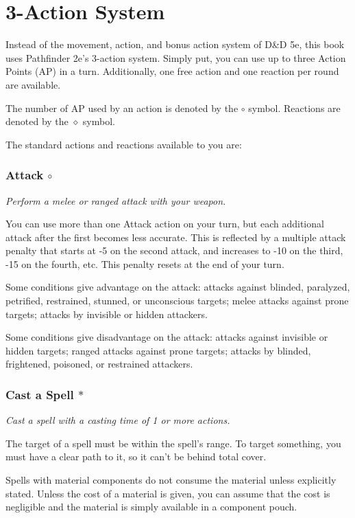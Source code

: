 \section{3-Action System} \label{sec::3actionsystem}
Instead of the movement, action, and bonus action system of D\&D 5e, this book uses Pathfinder 2e's 3-action system.
Simply put, you can use up to three Action Points (AP) in a turn.
Additionally, one free action and one reaction per round are available.

The number of AP used by an action is denoted by the $\circ$ symbol.
Reactions are denoted by the $\diamond$ symbol. %

The standard actions and reactions available to you are:

\subsubsection{Attack $\circ$} \label{act::attack}
    \textit{Perform a melee or ranged attack with your weapon.}

    You can use more than one Attack action on your turn, but each additional attack after the first becomes less accurate.
    This is reflected by a multiple attack penalty that starts at -5 on the second attack, and increases to -10 on the third, -15 on the fourth, etc.
    This penalty resets at the end of your turn.

    Some conditions give advantage on the attack: attacks against blinded, paralyzed, petrified, restrained, stunned, or unconscious targets; melee attacks against prone targets; attacks by invisible or hidden attackers.

    Some conditions give disadvantage on the attack: attacks against invisible or hidden targets; ranged attacks against prone targets; attacks by blinded, frightened, poisoned, or restrained attackers.
\subsubsection{Cast a Spell $\ast$} \label{act::castaspell}
    \textit{Cast a spell with a casting time of 1 or more actions.}

    The target of a spell must be within the spell's range.
    To target something, you must have a clear path to it, so it can't be behind total cover.

    Spells with material components do not consume the material unless explicitly stated.
    Unless the cost of a material is given, you can assume that the cost is negligible and the material is simply available in a component pouch.

